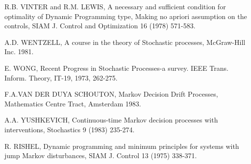 \begin{thebibliography}{99}
 {R.B. VINTER and R.M. LEWIS}, A necessary and
  sufficient condition for optimality of Dynamic Programming type,
  Making no apriori assumption on the controls, SIAM J. Control and
  Optimization 16 (1978) 571-583. 

 {A.D. WENTZELL}, A course in the theory of
  Stochastic processes, McGraw-Hill Inc. 1981. 

 {E. WONG}, Recent Progress in Stochastic
  Processes-a survey. IEEE Trans. Inform. Theory, IT-19, 1973,
  262-275. 

 {F.A.VAN DER DUYA SCHOUTON, Markov\pageoriginale
  Decision Drift Processes}, Mathematics Centre Tract, Amsterdam 1983.  

 {A.A. YUSHKEVICH, Continuous-time Markov decision
  processes with interventions}, Stochastics 9 (1983) 235-274. 

 {R. RISHEL}, Dynamic programming and minimum
  principles for systems with jump Markov disturbances, SIAM
  J. Control 13 (1975) 338-371. 
\end{thebibliography}


